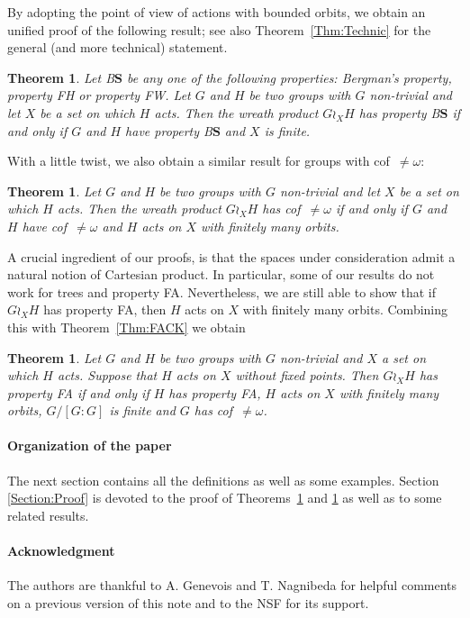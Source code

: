 \documentclass[a4paper]{article}
\newtheorem{thm}[lem]{Theorem}
\theoremstyle{definition}
\newcommand*{\BS}{B$\mathbf{S}$}
\begin{document}
By adopting the point of view of actions with bounded orbits, we obtain an unified proof of the following result; see also Theorem~\ref{Thm:Technic} for the general (and more technical) statement.
%
%
\begin{thm}\label{Thm:Main}
Let \BS{} be any one of the following properties: Bergman's property, property FH or property FW.
Let $G$ and $H$ be two groups with $G$ non-trivial and let $X$ be a set on which $H$ acts. Then the wreath product $G \wr_X H$ has property \BS{} if and only if $G$ and $H$ have property \BS{} and $X$ is finite.
\end{thm}
%
%
With a little twist, we also obtain a similar result for groups with cof~$\neq\omega$:
\begin{thm}\label{Thm:UncCoun}
Let $G$ and $H$ be two groups with $G$ non-trivial and let $X$ be a set on which $H$ acts. Then the wreath product $G \wr_X H$ has cof~$\neq\omega$ if and only if $G$ and $H$ have cof~$\neq\omega$ and $H$ acts on $X$ with finitely many orbits.
\end{thm}
%
%
A crucial ingredient of our proofs, is that the spaces under consideration admit a natural notion of Cartesian product.
In particular, some of our results do not work for trees and property FA.
Nevertheless, we are still able to show that if $G\wr_XH$ has property FA, then $H$ acts on $X$ with finitely many orbits. Combining this with Theorem~\ref{Thm:FACK} we obtain
\begin{thm}\label{Thm:FAFiniteOrbits}
Let $G$ and $H$ be two groups with $G$ non-trivial and $X$ a set on which $H$ acts. Suppose that $H$ acts on $X$ without fixed points.
Then $G\wr_XH$ has property FA if and only if $H$ has property FA, $H$ acts on $X$ with finitely many orbits, $G/[G:G]$ is finite and $G$ has cof~$\neq\omega$.
\end{thm}
%
%
%
%
\paragraph{Organization of the paper}
The next section contains all the definitions as well as some examples. Section \ref{Section:Proof} is devoted to the proof of Theorems~\ref{Thm:Main} and \ref{Thm:UncCoun} as well as to some related results.
%
%
%
\paragraph{Acknowledgment}
The authors are thankful to A. Genevois and T. Nagnibeda for helpful comments on a previous version of this note and to the NSF for its support.
%
%
%
%
%
%
%
%
%
%
%
%
%
\end{document}
